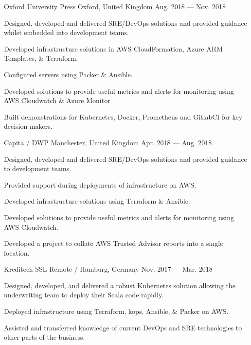 \begin{cventries}
    {Oxford University Press}
    {Oxford, United Kingdom}
    {Aug. 2018 — Nov. 2018}
    {
        \begin{cvitems}
        \item{Designed, developed and delivered SRE/DevOps solutions and provided guidance whilst embedded into development teams.}
        \item{Developed infrastructure solutions in AWS CloudFormation, Azure ARM Templates, \& Terraform.}
        \item{Configured servers using Packer \& Ansible.}
        \item{Developed solutions to provide useful metrics and alerts for monitoring using AWS Cloudwatch \& Azure Monitor}
        \item{Built demonstrations for Kubernetes, Docker, Prometheus and GitlabCI for key decision makers.}
        \end{cvitems}
    }

    {Capita / DWP}
    {Manchester, United Kingdom}
    {Apr. 2018 — Aug. 2018}
    {
        \begin{cvitems}
        \item{Designed, developed and delivered SRE/DevOps solutions and provided guidance to development teams.}
        \item{Provided support during deployments of infrastructure on AWS.}
        \item{Developed infrastructure solutions using Terraform \& Ansible.}
        \item{Developed solutions to provide useful metrics and alerts for monitoring using AWS Cloudwatch.}
        \item{Developed a project to collate AWS Trusted Advisor reports into a single location.}
        \end{cvitems}
    }

    {Kreditech SSL}
    {Remote / Hamburg, Germany}
    {Nov. 2017 — Mar. 2018}
    {
        \begin{cvitems}
        \item{Designed, developed, and delivered a robust Kubernetes solution allowing the underwriting team to deploy their Scala code rapidly.}
        \item{Deployed infrastructure using Terraform, kops, Ansible, \& Packer on AWS.}
        \item{Assisted and transferred knowledge of current DevOps and SRE technologies to other parts of the business.}
        \end{cvitems}
    }


\end{cventries}
